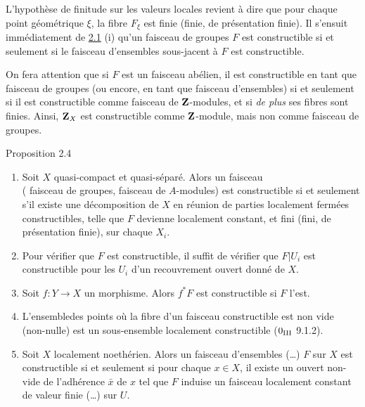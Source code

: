 \documentclass[10pt]{../fichiers-configuration-latex/smfart}
\begin{document}
\setcounter{subsection}{3}
\subsubsection{}
L'hypothèse de finitude sur les valeurs locales revient à dire que
pour chaque point géométrique $\xi$, la fibre $F_{\xi}$ est finie
(\resp finie, \resp de présentation finie). Il s'ensuit immédiatement
de \hyperref[IX.lem2.1]{2.1} (i) qu'un faisceau de groupes $F$ est constructible si et
seulement si le faisceau d'ensembles sous-jacent à $F$ est
constructible.

On fera attention que si $F$ est un faisceau abélien, il est
constructible en tant que faisceau de groupes (ou encore, en tant que
faisceau d'ensembles) si et seulement si il est constructible comme
faisceau de $\mathbf{Z}$-modules, et si \emph{de plus} ses
fibres sont finies. Ainsi, $\mathbf{Z}_X$ est
constructible comme $\mathbf{Z}$-module, mais non comme
faisceau de groupes.

\begin{enonce*}{Proposition 2.4}
\begin{enumerate}
\renewcommand{\theenumi}{\roman{enumi}}
\renewcommand{\labelenumi}{(\theenumi)}
\item Soit $X$ quasi-compact et quasi-séparé. Alors un faisceau \\ (\resp
  faisceau de groupes, \resp faisceau de $A$-modules) est
  constructible si et seulement s'il existe une décomposition de $X$
  en réunion de parties localement fermées constructibles, telle que
  $F$ devienne localement constant, et fini (\resp fini, \resp de
  présentation finie), sur chaque $X_i$.

\item Pour vérifier que $F$ est constructible, il suffit de vérifier
  que $F| U_i$ est constructible pour les $U_i$ d'un recouvrement
  ouvert donné de $X$.

\item Soit $f:Y\rightarrow X$ un morphisme. Alors $f^{\ast}F$ est
  constructible si $F$ l'est.

\item L'ensemble\pageoriginale des points où la fibre d'un faisceau
  constructible est non vide (\resp non-nulle) est un sous-ensemble
  localement constructible {\rm (\EGA $0_{\rm III}$ 9.1.2)}.

\item Soit $X$ localement noethérien. Alors un faisceau d'ensembles
  (\resp\ldots) $F$ sur $X$ est constructible si et seulement si pour
  chaque $x\in X$, il existe un ouvert non-vide de l'adhérence
  $\bar{x}$ de $x$ tel que $F$ induise un faisceau localement constant
  de valeur finie (\resp\ldots) sur $U$.
\end{enumerate}
\end{enonce*}
\end{document}
